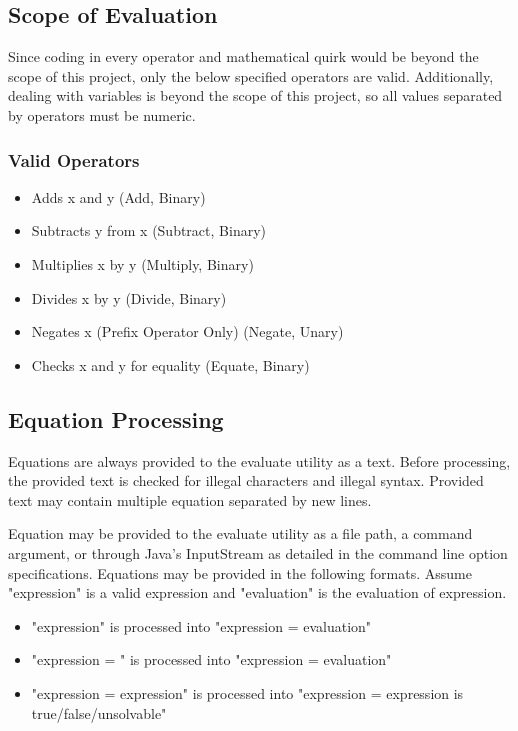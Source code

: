 \documentclass{article}
\begin{document}
\subsection{Scope of Evaluation}
Since coding in every operator and mathematical quirk would be beyond the scope of this project, only the below specified operators are valid. Additionally, dealing with variables is beyond the scope of this project, so all values separated by operators must be numeric.
\subsubsection{Valid Operators}
\begin{itemize}
	\item {} Adds x and y (Add, Binary)
	\item {} Subtracts y from x (Subtract, Binary)
	\item {} Multiplies x by y (Multiply, Binary)
	\item {} Divides x by y (Divide, Binary)
	\item {} Negates x (Prefix Operator Only) (Negate, Unary)
	\item {} Checks x and y for equality (Equate, Binary)
\end{itemize}

\subsection{Equation Processing}
Equations are always provided to the evaluate utility as a text. Before processing, the provided text is checked for illegal characters and illegal syntax. Provided text may contain multiple equation separated by new lines.

Equation may be provided to the evaluate utility as a file path, a command argument, or through Java's InputStream as detailed in the command line option specifications. Equations may be provided in the following formats. Assume "expression" is a valid expression and "evaluation" is the evaluation of expression.

\begin{itemize}
	\item "expression" is processed into "expression = evaluation"
	\item "expression = " is processed into "expression = evaluation"
	\item "expression = expression" is processed into "expression = expression is true/false/unsolvable"
\end{itemize}
\end{document}
